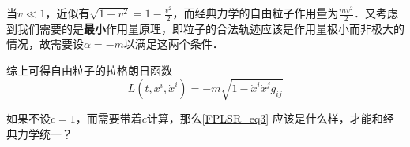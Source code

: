 当$v\ll 1$，近似有$\sqrt{1-v^2}=1-\frac{v^2}{2}$，而经典力学的自由粒子作用量为$\frac{mv^2}{2}$．又考虑到我们需要的是\textbf{最小}作用量原理，即粒子的合法轨迹应该是作用量极小而非极大的情况，故需要设$\alpha=-m$以满足这两个条件．

综上可得自由粒子的拉格朗日函数
\begin{equation}\label{FPLSR_eq3}
L(t, x^i, \dot{x}^i) = -m\sqrt{1-\dot{x}^i\dot{x}^jg_{ij}}
\end{equation}

\begin{exercise}{}
如果不设$c=1$，而需要带着$c$计算，那么\autoref{FPLSR_eq3} 应该是什么样，才能和经典力学统一？
\end{exercise}